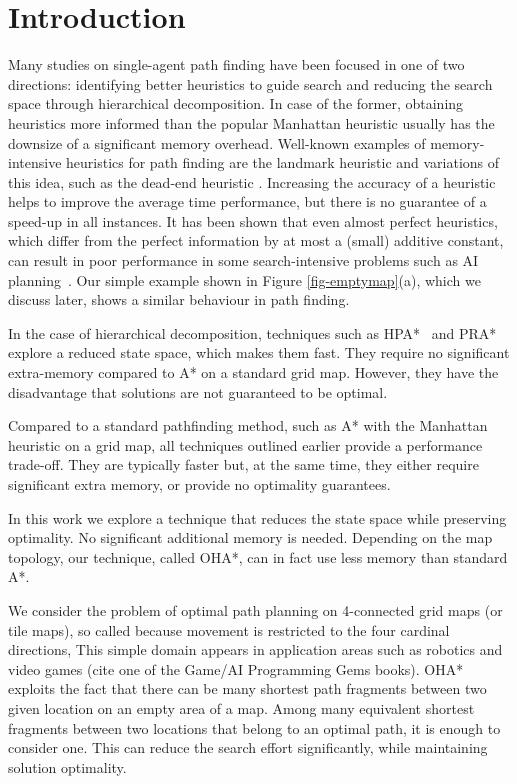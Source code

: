\section{Introduction}
Many studies on single-agent path finding have been focused in one of two directions:
identifying better heuristics to 
guide search and reducing the search space through hierarchical decomposition.
In case of the former, obtaining heuristics more informed than the popular
Manhattan heuristic usually has the downsize of a significant memory overhead.
Well-known examples of memory-intensive heuristics for path finding are
the landmark heuristic \cite{} and variations of this idea, such as the dead-end heuristic \cite{}.
Increasing the accuracy of a heuristic helps to improve the average time performance,
but there is no guarantee of a speed-up in all instances.
It has been shown that even almost perfect heuristics,
which differ from the perfect information by at most a (small) additive constant,
can result in poor performance in some search-intensive problems such as AI planning~\cite{malte08,korf98}.
Our simple example shown in Figure \ref{fig-emptymap}(a), which we discuss later,
shows a similar behaviour in path finding.

In the case of hierarchical decomposition, techniques such as
HPA*~\cite{BoteaMS04} and PRA*~\cite{Sturtevant:05} explore a reduced state space, 
which makes them fast. They require no significant extra-memory
compared to A* on a standard grid map.
However, they have the disadvantage that solutions are not guaranteed 
to be optimal.

Compared to a standard pathfinding method, such as A* with 
the Manhattan heuristic on a grid map,
all techniques outlined earlier provide a performance trade-off.
They are typically faster but, at the same time, they either require significant
extra memory, or provide no optimality guarantees.

In this work we explore a technique that reduces the state space while preserving optimality.
No significant additional memory is needed. Depending on the map topology,
our technique, called OHA*, can in fact use less memory than standard A*.

We consider the problem of optimal path planning on 4-connected grid maps (or tile maps), so called because movement is restricted to the four cardinal directions, 
This simple domain appears in application areas such as robotics \cite{latombe91} and video games 
(cite one of the Game/AI Programming Gems books).
OHA* exploits the fact that
there can be many shortest path fragments between two given location
on an empty area of a map.
Among many equivalent shortest fragments between two locations that belong to an optimal path,
it is enough to consider one.
This can reduce the search effort significantly, while maintaining solution optimality.

